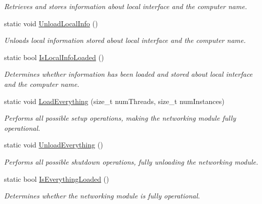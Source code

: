 \begin{DoxyCompactItemize}
\begin{DoxyCompactList}\small\item\em Retrieves and stores information about local interface and the computer name. \item\end{DoxyCompactList}\item 
static void \hyperlink{class_net_utility_aec9d16aa859066548409b9b692077b49}{UnloadLocalInfo} ()
\begin{DoxyCompactList}\small\item\em Unloads local information stored about local interface and the computer name. \item\end{DoxyCompactList}\item 
static bool \hyperlink{class_net_utility_af8d183510e0ec6eb8019eb3955180485}{IsLocalInfoLoaded} ()
\begin{DoxyCompactList}\small\item\em Determines whether information has been loaded and stored about local interface and the computer name. \item\end{DoxyCompactList}\item 
static void \hyperlink{class_net_utility_a0e67f2b38e5dd236c597eb6b1a51a39e}{LoadEverything} (size\_\-t numThreads, size\_\-t numInstances)
\begin{DoxyCompactList}\small\item\em Performs all possible setup operations, making the networking module fully operational. \item\end{DoxyCompactList}\item 
static void \hyperlink{class_net_utility_a9f81602db0e4c48e6d9110a32cdf9bdd}{UnloadEverything} ()
\begin{DoxyCompactList}\small\item\em Performs all possible shutdown operations, fully unloading the networking module. \item\end{DoxyCompactList}\item 
static bool \hyperlink{class_net_utility_a612bb9b27e597c9855296cd466d2d66c}{IsEverythingLoaded} ()
\begin{DoxyCompactList}\small\item\em Determines whether the networking module is fully operational. \item\end{DoxyCompactList}\item 

\end{DoxyCompactItemize}
